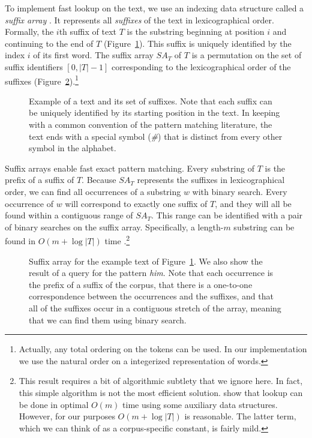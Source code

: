 To implement fast lookup on the text, we use an indexing data structure
called a {\em suffix array} \citep{Manber:1993:sicomp}.  It 
represents all {\em suffixes} of the text in lexicographical order.
Formally, the $i$th suffix of text $T$ is the substring
beginning at position $i$ and continuing to the end of $T$ (Figure~\ref{fig:text}).
This suffix is uniquely identified by the index $i$ of its first word.
The suffix array $SA_T$ of $T$ is a permutation on the 
set of suffix identifiers $[0,|T|-1]$ 
corresponding to the lexicographical order of the
suffixes (Figure~\ref{fig:suffix-array}).\footnote{Actually,
any total ordering on the tokens can be used.
In our implementation we use the natural order on a
integerized representation of words.}

\figpreamble
\begin{figure}
	\figfontsize{
	\begin{center}
		
	\end{center}}
	\figpostamble
	\caption[Example of a text and its set of suffixes]{Example of a 
	text and its set of suffixes.  Note that each suffix can be uniquely
	identified by its starting position in the text.
	In keeping with a common convention of the pattern matching literature,
	the text ends with a special
	symbol ({\em \#}) that is distinct from every other symbol in the
	alphabet.}
	\label{fig:text}
\end{figure}

Suffix arrays enable fast exact pattern matching.  Every substring of $T$
is the prefix of a suffix of $T$.  Because $SA_T$ represents
the suffixes in lexicographical order, we can find all occurrences of a 
substring $w$ with binary search.  Every occurrence of $w$ will correspond to exactly one
suffix of $T$, and they will all be found within a contiguous range of $SA_T$.
This range can be identified with a pair of binary searches on the suffix
array.  Specifically, a length-$m$ substring can be found in $O(m + \log |T|)$ time 
\citep{Manber:1993:sicomp}.\footnote{This result requires a bit of algorithmic
subtlety that we ignore here.  In fact, this simple algorithm is not the most
efficient solution.  \citet{Abouelhoda:2004:jda} show that
lookup can be done in optimal $O(m)$ time using some auxiliary data structures.
However, for our purposes $O(m + \log |T|)$ is reasonable.  The latter term, which we
can think of as a corpus-specific constant, is fairly mild.}

\figpreamble
\begin{figure}
	\figfontsize{
	\begin{center}
		
	\end{center}}
	\figpostamble
	\caption[Suffix array example]{Suffix array for the example text of Figure~\ref{fig:text}.
	We also show the result of a query for the pattern {\em him}.  Note that each occurrence
	is the prefix of a suffix of the corpus, that there is a one-to-one correspondence between
	the occurrences and the suffixes, and that all of the suffixes occur in a contiguous 
	stretch of the array, meaning that we can find them using binary search.}
	 \label{fig:suffix-array}
\end{figure}


